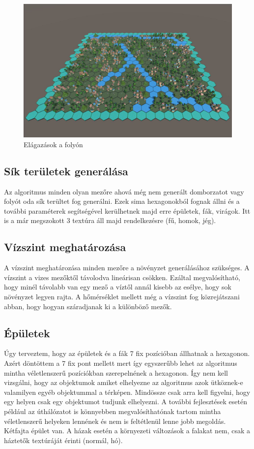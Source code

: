 \begin{figure}[h!]
\centering
\includegraphics[scale=0.3]{kepek/img11_4_3_2.JPG}
\caption{Elágazások a folyón}
\label{fig:img11_4_3_2}
\end{figure}

\subsection{Sík területek generálása}

Az algoritmus minden olyan mezőre ahová még nem generált domborzatot vagy folyót oda sík terültet fog generálni. Ezek sima hexagonokból fognak állni és a további paraméterek segítségével kerülhetnek majd erre épületek, fák, virágok. Itt is a már megszokott 3 textúra áll majd rendelkezésre (fű, homok, jég).

\subsection{Vízszint meghatározása}

A vízszint meghatározása minden mezőre a növényzet generálásához szükséges. A vízszint a vizes mezőktől távolodva lineárisan csökken. Ezáltal megvalósítható, hogy minél távolabb van egy mező a víztől annál kisebb az esélye, hogy sok növényzet legyen rajta. A hőmérséklet mellett még a vízszint fog közrejátszani abban, hogy hogyan száradjanak ki a különböző mezők.

\subsection{Épületek}

Úgy terveztem, hogy az épületek és a fák 7 fix pozícióban állhatnak a hexagonon. Azért döntöttem a 7 fix pont mellett mert így egyszerűbb lehet az algoritmus mintha véletlenszerű pozíciókban szerepelnének a hexagonon. Így nem kell vizsgálni, hogy az objektumok amiket elhelyezne az algoritmus azok ütköznek-e valamilyen egyéb objektummal a térképen. Mindössze csak arra kell figyelni, hogy egy helyen csak egy objektumot tudjunk elhelyezni. A további fejlesztések esetén például az úthálózatot is könnyebben megvalósíthatónak tartom mintha véletlenszerű helyeken lennének és nem is feltétlenül lenne jobb megoldás. Kétfajta épület van. A házak esetén a környezeti változások a falakat nem, csak a háztetők textúráját érinti (normál, hó).

